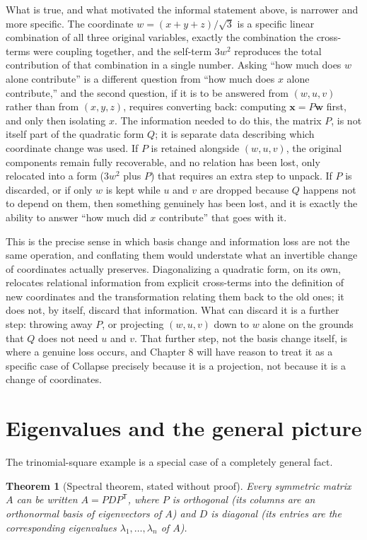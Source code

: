 \documentclass[11pt]{book}
\newtheorem{theorem}{Theorem}[chapter]
\begin{document}
What is true, and what motivated the informal statement above, is narrower and more specific. The coordinate $w=(x+y+z)/\sqrt3$ is a specific linear combination of all three original variables, exactly the combination the cross-terms were coupling together, and the self-term $3w^2$ reproduces the total contribution of that combination in a single number. Asking ``how much does $w$ alone contribute'' is a different question from ``how much does $x$ alone contribute,'' and the second question, if it is to be answered from $(w,u,v)$ rather than from $(x,y,z)$, requires converting back: computing $\mathbf{x}=P\mathbf{w}$ first, and only then isolating $x$. The information needed to do this, the matrix $P$, is not itself part of the quadratic form $Q$; it is separate data describing which coordinate change was used. If $P$ is retained alongside $(w,u,v)$, the original components remain fully recoverable, and no relation has been lost, only relocated into a form ($3w^2$ plus $P$) that requires an extra step to unpack. If $P$ is discarded, or if only $w$ is kept while $u$ and $v$ are dropped because $Q$ happens not to depend on them, then something genuinely has been lost, and it is exactly the ability to answer ``how much did $x$ contribute'' that goes with it.

This is the precise sense in which basis change and information loss are not the same operation, and conflating them would understate what an invertible change of coordinates actually preserves. Diagonalizing a quadratic form, on its own, relocates relational information from explicit cross-terms into the definition of new coordinates and the transformation relating them back to the old ones; it does not, by itself, discard that information. What can discard it is a further step: throwing away $P$, or projecting $(w,u,v)$ down to $w$ alone on the grounds that $Q$ does not need $u$ and $v$. That further step, not the basis change itself, is where a genuine loss occurs, and Chapter 8 will have reason to treat it as a specific case of Collapse precisely because it is a projection, not because it is a change of coordinates.

\section{Eigenvalues and the general picture}

The trinomial-square example is a special case of a completely general fact.

\begin{theorem}[Spectral theorem, stated without proof]
Every symmetric matrix $A$ can be written $A = P D P^{\mathsf T}$, where $P$ is orthogonal (its columns are an orthonormal basis of eigenvectors of $A$) and $D$ is diagonal (its entries are the corresponding eigenvalues $\lambda_1,\ldots,\lambda_n$ of $A$).
\end{theorem}
\end{document}
